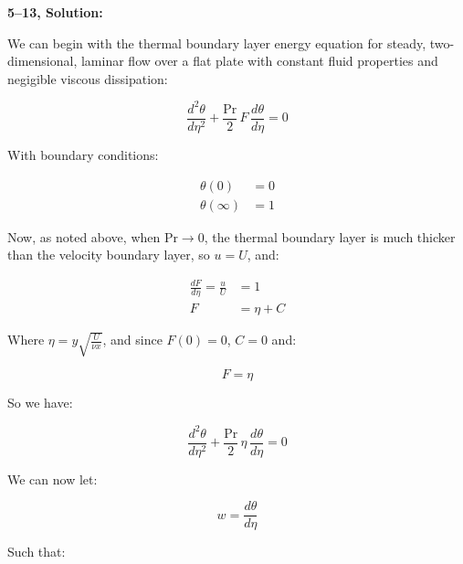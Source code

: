 \documentclass[letterpaper,12pt]{article}
\begin{document}
\vspace{6pt}


\textbf{5--13, Solution:}

We can begin with the thermal boundary layer energy equation for steady, two-dimensional, laminar flow over a flat plate with constant fluid properties and negigible viscous dissipation:

\begin{equation}
    \frac{d^2\theta}{d\eta^2}+\frac{\text{Pr}}{2}\,F\,\frac{d\theta}{d\eta}=0
\end{equation}

With boundary conditions:

\begin{equation}
\begin{aligned}
    \theta(0)      &= 0 \\
    \theta(\infty) &= 1
\end{aligned}
\end{equation}

Now, as noted above, when $\text{Pr} \to 0$, the thermal boundary layer is much thicker than the velocity boundary layer, so $u = U$, and:

\begin{equation}
\begin{aligned}
        \frac{dF}{d\eta}=\frac{u}{U} &= 1 \\
        F                            &= \eta + C
\end{aligned}
\end{equation}

Where $\eta=y\sqrt{\frac{U}{\nu x}}$, and since $F(0)=0$, $C = 0$ and:

\begin{equation}
    F=\eta
\end{equation}

So we have:

\begin{equation}
    \frac{d^2\theta}{d\eta^2}+\frac{\text{Pr}}{2}\,\eta\,\frac{d\theta}{d\eta}=0
\end{equation}

We can now let:

\begin{equation}
    w=\frac{d\theta}{d\eta}
\end{equation}

Such that:
\end{document}
